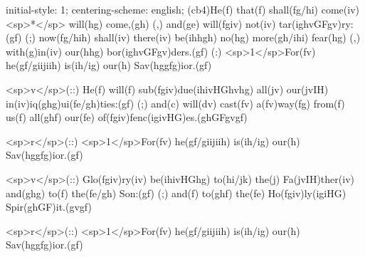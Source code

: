 initial-style: 1;
centering-scheme: english;
(cb4)He(f) that(f) shall(fg/hi) come(iv) <sp>*</sp> will(hg) come,(gh) (,) and(ge) will(fgiv) not(iv) tar(ighvGFgv)ry:(gf) (;) now(fg/hih) shall(iv) there(iv) be(ihhgh) no(hg) more(gh/ihi) fear(hg) (,) with(g)in(iv) our(hhg) bor(ighvGFgv)ders.(gf) (:) <sp>1</sp>For(fv) he(gf/giijiih) is(ih/ig) our(h) Sav(hggfg)ior.(gf) 

<sp>v</sp>(::) He(f) will(f) sub(fgiv)due(ihivHGhvhg) all(jv) our(jvIH) in(iv)iq(ghg)ui(fe/gh)ties:(gf) (;) and(c) will(dv) cast(fv) a(fv)way(fg) from(f) us(f) all(ghf) our(fe) of(fgiv)fenc(igivHG)es.(ghGFgvgf) 

<sp>r</sp>(::) <sp>1</sp>For(fv) he(gf/giijiih) is(ih/ig) our(h) Sav(hggfg)ior.(gf) 

<sp>v</sp>(::) Glo(fgiv)ry(iv) be(ihivHGhg) to(hi/jk) the(j) Fa(jvIH)ther(iv) and(ghg) to(f) the(fe/gh) Son:(gf) (;) and(f) to(ghf) the(fe) Ho(fgiv)ly(igiHG) Spir(ghGF)it.(gvgf)

<sp>r</sp>(::) <sp>1</sp>For(fv) he(gf/giijiih) is(ih/ig) our(h) Sav(hggfg)ior.(gf) 